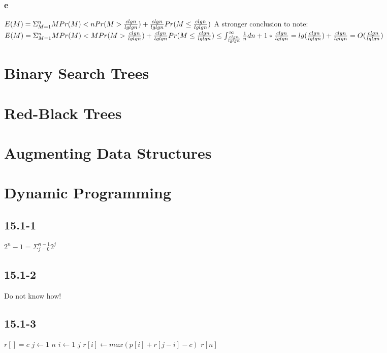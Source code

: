 \documentclass[]{article}
\begin{document}
\subsubsection{e}

$E(M) = \Sigma_{M = 1}^{n} M Pr(M) < nPr(M>\frac{clgn}{lglgn}) + \frac{clgn}{lglgn}Pr(M \le \frac{clgn}{lglgn})\\$
A stronger conclusion to note: \\
$E(M) = \Sigma_{M = 1}^{n} M Pr(M) < MPr(M>\frac{clgn}{lglgn}) + \frac{clgn}{lglgn}Pr(M \le \frac{clgn}{lglgn})\\
\le \int_{\frac{clgn}{lglgn}}^{\infty}\frac{1}{n}dn + 1*\frac{clgn}{lglgn} \\
= lg (\frac{clgn}{lglgn}) + \frac{clgn}{lglgn}\\ = O(\frac{clgn}{lglgn})$

\section{Binary Search Trees}
\section{Red-Black Trees}
\section{Augmenting Data Structures}

\section{Dynamic Programming}

\subsection{15.1-1}
$2^n -1 = \Sigma_{j = 0}^{n-1} 2^j $
\subsection{15.1-2}
Do not know how!

\subsection{15.1-3}
\begin{codebox}
	\li $r[] = c$
	\li  \For $j \gets 1$ \To $n$
	\li    \Do \For $i \gets 1$ \To $j$ 
	\li 		\Do $r[i] \leftarrow max (p[i] + r[j-i] - c)$
	\End
	\End
	\li \Return $r[n]$
\end{codebox}
\end{document}
